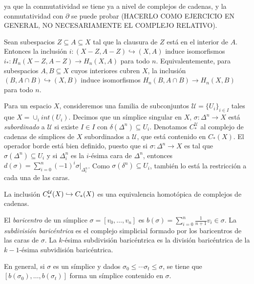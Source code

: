 \documentclass[TA.tex]{subfiles}
\begin{document}
ya que la conmutatividad se tiene ya a nivel de complejos de cadenas, y la conmutatividad con $\partial$ se puede probar (HACERLO COMO EJERCICIO EN GENERAL, NO NECESARIAMENTE EL COMPLEJO RELATIVO). 
 

\begin{teorema}[de excisión]\label{excision}
Sean subespacios $Z\subseteq A\subseteq X$ tal que la clausura de $Z$ está en el interior de $A$. Entonces la inclusión $i:(X-Z,A-Z)\hookrightarrow (X,A)$ induce isomorfismos $i_*:H_n(X-Z,A-Z)\to H_n(X,A)$ para todo $n$. Equivalentemente, para subespacios $A,B\subseteq X$ cuyos interiores cubren $X$, la inclusión $(B,A\cap B)\hookrightarrow (X,B)$ induce isomorfismos $H_n(B,A\cap B)\to H_n(X,B)$ para todo $n$. 
\end{teorema}

Para un espacio $X$, consideremos una familia de subconjuntos $\mathcal{U}=\{U_i\}_{i\in I}$ tales que $X=\cup_i int(U_i)$. Decimos que un símplice singular en $X$, $\sigma:\Delta^n\to X$ está \emph{subordinado} a $\mathcal{U}$ si existe $I\in I$ con $\delta(\Delta^n)\subseteq U_i$. Denotamos $C^{\mathcal{U}}_*$ al complejo de cadenas de símplices de $X$ subordinados a $\mathcal{U}$, que está contenido en $C_*(X)$.  El operador borde está bien definido, puesto que si $\sigma:\Delta^n\to X$ es tal que $\sigma(\Delta^n)\subseteq U_i$ y si $\Delta^n_i$ es la $i$-ésima cara de $\Delta^n$, entonces $d(\sigma)=\sum_{i=0}^n(-1)^i\sigma|_{\Delta^n_i}$. Como $\sigma(\delta^n)\subseteq U_i$, también lo está la restricción a cada una de las caras.

\begin{teorema}\label{peque}
La inclusión $C^{\mathcal{U}}_*(X)\hookrightarrow C_*(X)$ es una equivalencia homotópica de complejos de cadenas. 
\end{teorema}

\begin{defi}
El \emph{baricentro} de un símplice $\sigma=[v_0,\dots, v_n]$ es $b(\sigma)=\sum_{i=0}^n\frac{1}{n+1}v_i\in \sigma$. La \emph{subdivisión baricéntrica} es el complejo simplicial formado por los baricentros de las caras de $\sigma$. La $k$-ésima subdivisión baricéntrica es la división baricéntrica de la $k-1$-ésima subvidisión baricéntrica.
\end{defi}

En general, si $\sigma$ es un símplice y dados $\sigma_0\leq\cdots\sigma_t\leq\sigma$, se tiene que $[b(\sigma_0),\dots, b(\sigma_t)]$ forma un símplice contenido en $\sigma$. 
\end{document}
